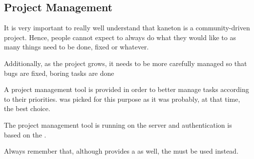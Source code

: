 %
%
%
%
%
%

%
%

\subsection{Project Management}
\label{section:project management}

It is very important to really well understand that kaneton is a
community-driven project. Hence, people cannot expect to always do what
they would like to as many things need to be done, fixed or whatever.

Additionally, as the project grows, it needs to be more carefully managed
so that bugs are fixed, boring tasks are done \etc{}

A project management tool is provided in order to better manage tasks
according to their priorities.  was picked for this purpose
as it was probably, at that time, the best choice.

The project management tool is running on the  server
and authentication is based on the .

Always remember that, although  provides a  as well,
the   must be used instead.
